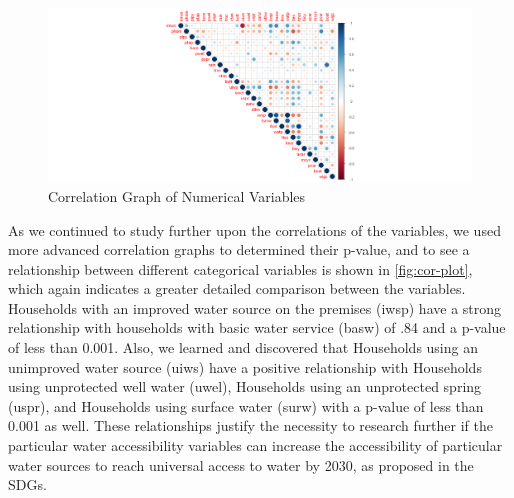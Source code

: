 \documentclass[10pt,twoside]{article}
\numberwithin{equation}{section}
\newcommand{\?}{\stackrel{?}{=}}
\begin{document}
\begin{figure}[h!]
  \centering
  \includegraphics[width=.7\textwidth]{correlation-basic}
  \caption{Correlation Graph of Numerical Variables}
  \label{fig:cor-basic}
\end{figure}
As we continued to study further upon the correlations of the variables, we used more advanced correlation graphs to determined their p-value, and to see a relationship between different categorical variables is shown in \autoref{fig:cor-plot}, which again indicates a greater detailed comparison between the variables. Households with an improved water source on the premises (iwsp) have a strong relationship with households with basic water service (basw) of .84 and a p-value of less than 0.001. Also, we learned and discovered that Households using an unimproved water source (uiws) have a positive relationship with Households using unprotected well water (uwel), Households using an unprotected spring (uspr), and Households using surface water (surw) with a p-value of less than 0.001 as well. These relationships justify the necessity to research further if the particular water accessibility variables can increase the accessibility of particular water sources to reach universal access to water by 2030, as proposed in the SDGs. 
\end{document}
